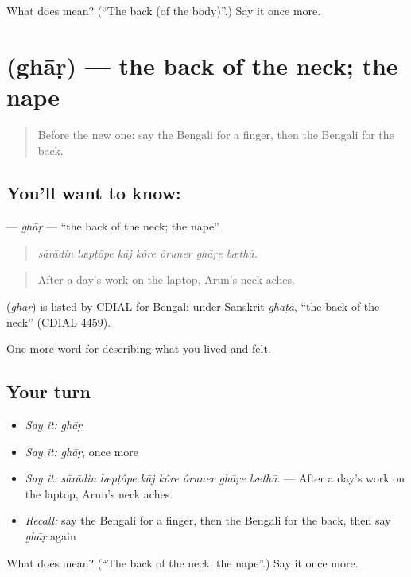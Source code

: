 \begin{tcolorbox}[breakable,colback=teal!4,colframe=teal!35!black,title={Before you move on}]
What does  mean? (\textquotedblleft{}The back (of the body)\textquotedblright{}.) Say it once more.
\end{tcolorbox}
\section[\texorpdfstring{\bn{ঘাড়} (ghāṛ)}{ঘাড় (ghāṛ)}]{ (ghāṛ) — the back of the neck; the nape}

\label{lesson:BN-C466-ghar}



\begin{quote}
Before the new one: say the Bengali for a finger, then the Bengali for the back.
\end{quote}

\subsection*{You'll want to know: }
\textbf{} — \emph{ghāṛ} — \textquotedblleft{}the back of the neck; the nape\textquotedblright{}.

\begin{quote}
      
\end{quote}

\begin{quote}
\emph{sārādin læpṭôpe kāj kôre ôruner ghāṛe bæthā.}
\end{quote}

\begin{quote}
After a day's work on the laptop, Arun's neck aches.
\end{quote}

\begin{cousinweb}
\textbf{} (\emph{ghāṛ}) is listed by CDIAL for Bengali under Sanskrit \emph{ghāṭā}, \textquotedblleft{}the back of the neck\textquotedblright{} (CDIAL 4459).
\end{cousinweb}

\begin{grammarlens}[title={What you've built}]
One more word for describing what you lived and felt.
\end{grammarlens}

\subsection*{Your turn}
\begin{itemize}
\raggedright
  \item \emph{Say it:} \emph{ghāṛ}
  \item \emph{Say it:} \emph{ghāṛ}, once more
  \item \emph{Say it:} \emph{sārādin læpṭôpe kāj kôre ôruner ghāṛe bæthā.} — After a day's work on the laptop, Arun's neck aches.
  \item \emph{Recall:} say the Bengali for a finger, then the Bengali for the back, then say \emph{ghāṛ} again
\end{itemize}

\begin{tcolorbox}[breakable,colback=teal!4,colframe=teal!35!black,title={Before you move on}]
What does  mean? (\textquotedblleft{}The back of the neck; the nape\textquotedblright{}.) Say it once more.
\end{tcolorbox}
